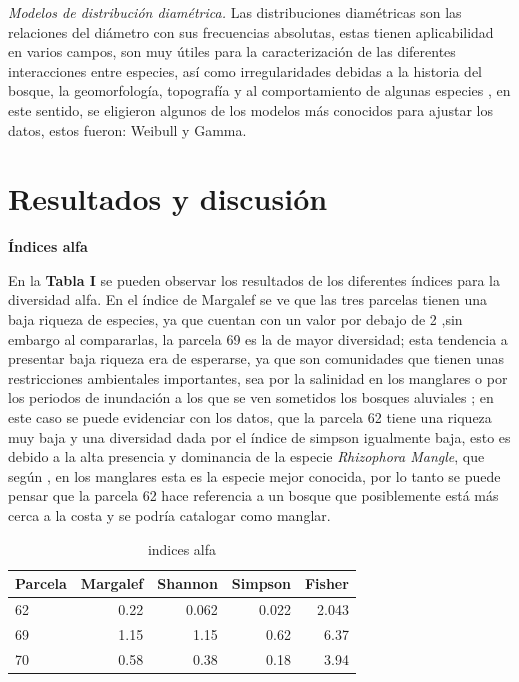 \documentclass[conference,final,12pt,]{IEEEtran}
\begin{document}
\emph{Modelos de distribución diamétrica.} Las distribuciones
diamétricas son las relaciones del diámetro con sus frecuencias absolutas, 
estas tienen aplicabilidad en varios campos, son muy útiles para la caracterización de  las diferentes interacciones entre especies, así como irregularidades debidas a la historia del bosque, la geomorfología, topografía y al comportamiento de algunas especies \citep{AE}, en este sentido, se eligieron algunos de los
modelos más conocidos para ajustar los datos, estos fueron: Weibull y
Gamma.

\hypertarget{resultados-y-discusiuxf3n}{%
\section{Resultados y discusión}\label{resultados-y-discusiuxf3n}}

\textbf{Índices alfa} 

En la \textbf{Tabla I} se pueden observar los
resultados de los diferentes índices para la diversidad alfa. En el
índice de Margalef se ve que las tres parcelas tienen una
baja riqueza de especies, ya que cuentan con un valor por debajo de 2
\citep{B},sin embargo al compararlas, la parcela 69 es la de mayor
diversidad; esta tendencia a presentar baja riqueza era de
esperarse, ya que son comunidades que tienen unas restricciones
ambientales importantes, sea por la salinidad en los manglares
\citep{AD} o por los periodos de inundación a los que se ven sometidos
los bosques aluviales \citep{Z}; en este caso se puede evidenciar con los
datos, que la parcela 62 tiene una riqueza muy baja
y una diversidad dada por el índice de simpson igualmente baja, esto es
debido a la alta presencia y dominancia de la especie \emph{Rhizophora
Mangle}, que según \citep{Z}, en los manglares esta es la especie mejor
conocida, por lo tanto se puede pensar que la parcela 62 hace referencia
a un bosque que posiblemente está más cerca a la costa y se podría
catalogar como manglar.

\begin{table}[htb]

\caption{\label{tab:unnamed-chunk-2}indices alfa}
\centering
\begin{tabular}[t]{l|r|r|r|r}
\hline
Parcela & Margalef & Shannon & Simpson & Fisher\\
\hline
62 & 0.22 & 0.062 & 0.022 & 2.043\\
\hline
69 & 1.15 & 1.15 & 0.62 & 6.37\\
\hline
70 & 0.58 & 0.38 & 0.18 & 3.94\\
\hline
\end{tabular}
\end{table}
\end{document}

